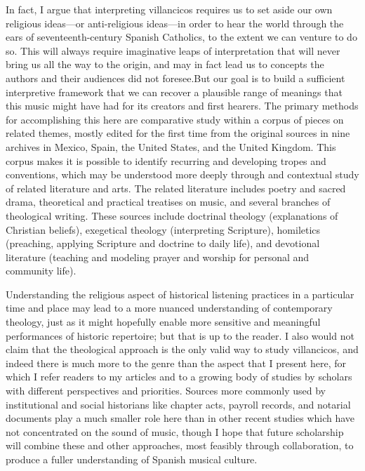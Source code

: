 In fact, I argue that interpreting villancicos requires us to set aside our own
religious ideas---or anti-religious ideas---in order to hear the world through
the ears of seventeenth-century Spanish Catholics, to the extent we can venture
to do so.
This will always require imaginative leaps of interpretation that will never
bring us all the way to the origin, and may in fact lead us to concepts the
authors and their audiences did not foresee.
But our goal is to build a sufficient interpretive framework that we can
recover a plausible range of meanings that this music might have had for its
creators and first hearers.
The primary methods for accomplishing this here are comparative study within a
corpus of pieces on related themes, mostly edited for the first time from the
original sources in nine archives in Mexico, Spain, the United States, and the
United Kingdom.
This corpus makes it is possible to identify recurring and developing tropes
and conventions, which may be understood more deeply through and contextual
study of related literature and arts.
The related literature includes poetry and sacred drama, theoretical and
practical treatises on music, and several branches of theological writing.
These sources include doctrinal theology (explanations of Christian beliefs),
exegetical theology (interpreting Scripture), homiletics (preaching, applying
Scripture and doctrine to daily life), and devotional literature (teaching and
modeling prayer and worship for personal and community life).

Understanding the religious aspect of historical listening practices in a
particular time and place may lead to a more nuanced understanding of
contemporary theology, just as it might hopefully enable more sensitive and
meaningful performances of historic repertoire; but that is up to the reader.
I also would not claim that the theological approach is the only valid way to
study villancicos, and indeed there is much more to the genre than the aspect
that I present here, for which I refer readers to my articles and to a growing
body of studies by scholars with different perspectives and priorities.
Sources more commonly used by institutional and social historians like chapter
acts, payroll records, and notarial documents play a much smaller role here
than in other recent studies which have not concentrated on the sound
of music, though I hope that future scholarship will combine these and other
approaches, most feasibly through collaboration, to produce a fuller
understanding of Spanish musical culture.

